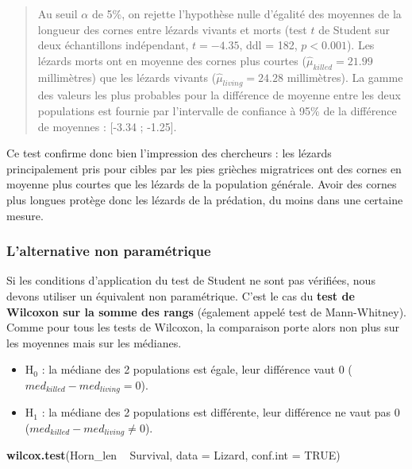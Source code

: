 \documentclass[a4paperpaper,]{article}
\newenvironment{Shaded}{\begin{snugshade}}{\end{snugshade}}
\newcommand{\DataTypeTok}[1]{\textcolor[rgb]{0.00,0.34,0.68}{#1}}
\newcommand{\KeywordTok}[1]{\textcolor[rgb]{0.12,0.11,0.11}{\textbf{#1}}}
\newcommand{\NormalTok}[1]{\textcolor[rgb]{0.12,0.11,0.11}{#1}}
\newcommand{\OperatorTok}[1]{\textcolor[rgb]{0.12,0.11,0.11}{#1}}
\newcommand{\OtherTok}[1]{\textcolor[rgb]{0.00,0.43,0.16}{#1}}
\newcommand{\StringTok}[1]{\textcolor[rgb]{0.75,0.01,0.01}{#1}}
\providecommand{\tightlist}{%
  \setlength{\itemsep}{0pt}\setlength{\parskip}{0pt}}
\begin{document}
\begin{quote}
Au seuil \(\alpha\) de 5\%, on rejette l'hypothèse nulle d'égalité des moyennes de la longueur des cornes entre lézards vivants et morts (test \(t\) de Student sur deux échantillons indépendant, \(t = -4.35\), ddl = 182, \(p < 0.001\)). Les lézards morts ont en moyenne des cornes plus courtes (\(\hat{\mu}_{killed} = 21.99\) millimètres) que les lézards vivants (\(\hat{\mu}_{living} = 24.28\) millimètres). La gamme des valeurs les plus probables pour la différence de moyenne entre les deux populations est fournie par l'intervalle de confiance à 95\% de la différence de moyennes : {[}-3.34 ; -1.25{]}.
\end{quote}

Ce test confirme donc bien l'impression des chercheurs : les lézards principalement pris pour cibles par les pies grièches migratrices ont des cornes en moyenne plus courtes que les lézards de la population générale. Avoir des cornes plus longues protège donc les lézards de la prédation, du moins dans une certaine mesure.

\hypertarget{lalternative-non-paramuxe9trique-2}{%
\subsubsection{L'alternative non paramétrique}\label{lalternative-non-paramuxe9trique-2}}

Si les conditions d'application du test de Student ne sont pas vérifiées, nous devons utiliser un équivalent non paramétrique. C'est le cas du \textbf{test de Wilcoxon sur la somme des rangs} (également appelé test de Mann-Whitney). Comme pour tous les tests de Wilcoxon, la comparaison porte alors non plus sur les moyennes mais sur les médianes.

\begin{itemize}
\tightlist
\item
  H\(_0\) : la médiane des 2 populations est égale, leur différence vaut 0 (\(med_{killed}-med_{living} = 0\)).
\item
  H\(_1\) : la médiane des 2 populations est différente, leur différence ne vaut pas 0 (\(med_{killed}-med_{living}\neq 0\)).
\end{itemize}

\begin{Shaded}
\begin{Highlighting}[]
\KeywordTok{wilcox.test}\NormalTok{(Horn_len }\OperatorTok{~}\StringTok{ }\NormalTok{Survival, }\DataTypeTok{data =}\NormalTok{ Lizard, }\DataTypeTok{conf.int =} \OtherTok{TRUE}\NormalTok{)}
\end{Highlighting}
\end{Shaded}
\end{document}
